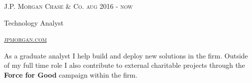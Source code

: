 {
  \textsc{\small{J.P. Morgan Chase \& Co. 
      \hfill
          {\raggedleft
              aug 2016 - now
          } \\
      }
  }
  {\raggedright\large {
   Technology Analyst 
  } \\}

  \textsc{\small\href{http://www.jpmorgan.com}{jpmorgan.com}}

  \normalsize{\raggedright
    As a graduate analyst I help build and deploy new solutions in the firm. Outside of my full time role I also contribute to external charitable projects through the \textbf{Force for Good} campaign within the firm. 
  }
}